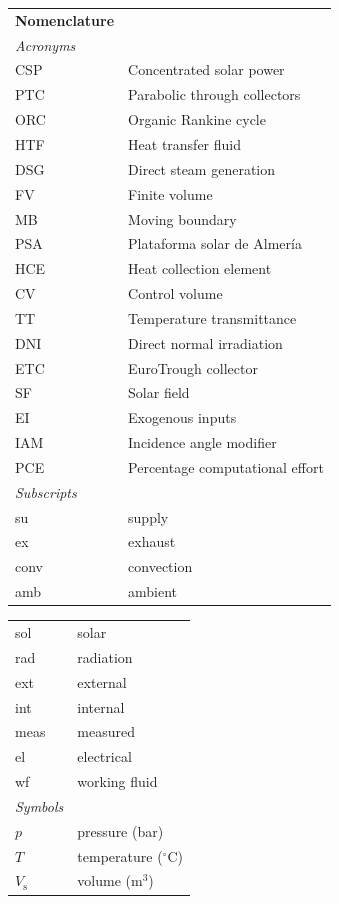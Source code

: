 \documentclass[final,3p,times,review]{elsarticle}
\begin{document}

\begin{table}[h!]
\begin{tabular}{lp{7.5cm}}
\textbf{Nomenclature}\\
\textit{Acronyms} \\
CSP & Concentrated solar power\\
PTC & Parabolic through collectors\\
ORC & Organic Rankine cycle\\
HTF & Heat transfer fluid\\
DSG & Direct steam generation\\
FV  & Finite volume \\
MB & Moving boundary \\
PSA & Plataforma solar de Almer\' ia \\
HCE & Heat collection element \\
CV & Control volume \\
TT & Temperature transmittance \\
DNI & Direct normal irradiation \\
ETC & EuroTrough collector \\
SF & Solar field \\
EI & Exogenous inputs \\
IAM & Incidence angle modifier \\
PCE & Percentage computational effort \\
\textit{Subscripts} \\
su  & supply \\
ex & exhaust \\
conv & convection \\
amb & ambient \\
\end{tabular}
\begin{tabular}{lp{7.5cm}}
sol  & solar\\
rad & radiation\\
ext & external\\
int & internal \\
meas & measured \\
el & electrical \\
wf & working fluid \\
\textit{Symbols} \\
$p$ & pressure (bar)\\
$T$ & temperature ($^{\circ}$C)\\
$V_\mathrm{s}$ & volume (m$^3$)\\

\end{tabular}
\end{table}
\end{document}
